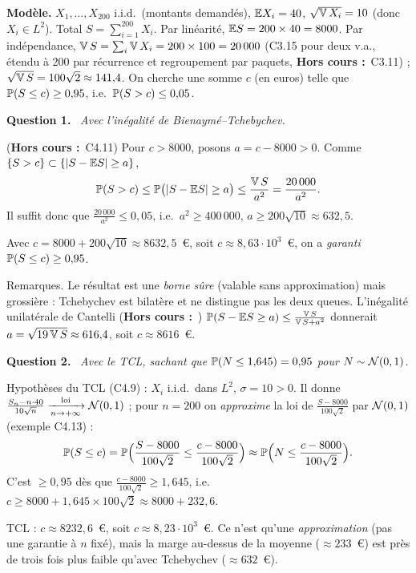 \documentclass[11pt,a4paper]{article}
\newcommand{\question}[1]{\par\medskip\noindent\textbf{Question #1.}~}
\newcommand{\hc}{\textbf{Hors cours :}~}
\begin{document}
\begin{exo}

\textbf{Modèle.} $X_1,\dots,X_{200}$ i.i.d.\ (montants demandés), $\mathbb{E} X_i=40$, $\sqrt{\operatorname{\mathbb{V}} X_i}=10$ (donc $X_i\in L^2$). Total
$S=\sum_{i=1}^{200}X_i$. Par linéarité, $\mathbb{E} S=200\times40=8000$. Par indépendance, $\operatorname{\mathbb{V}} S=\sum_i\operatorname{\mathbb{V}} X_i=200\times100=20\,000$
(C3.15 pour deux v.a., étendu à 200 par récurrence et regroupement par paquets, \hc C3.11) ; $\sqrt{\operatorname{\mathbb{V}} S}=100\sqrt2\approx141{,}4$.
On cherche une somme $c$ (en euros) telle que $\mathbb{P}(S\le c)\ge0{,}95$, i.e.\ $\mathbb{P}(S>c)\le0{,}05$.

\question{1} \emph{Avec l'inégalité de Bienaymé--Tchebychev.}

(\hc C4.11) Pour $c>8000$, posons $a=c-8000>0$. Comme $\{S>c\}\subset\{|S-\mathbb{E} S|\ge a\}$,
\[\mathbb{P}(S>c)\le\mathbb{P}\bigl(|S-\mathbb{E} S|\ge a\bigr)\le\frac{\operatorname{\mathbb{V}} S}{a^2}=\frac{20\,000}{a^2}.\]
Il suffit donc que $\frac{20\,000}{a^2}\le0{,}05$, i.e.\ $a^2\ge400\,000$, $a\ge200\sqrt{10}\approx632{,}5$.
\begin{resultat}
Avec $c=8000+200\sqrt{10}\approx8632{,}5$~€, soit $c\approx8{,}63\cdot10^3$~€, on a \emph{garanti} $\mathbb{P}(S\le c)\ge0{,}95$.
\end{resultat}
Remarques. Le résultat est une \emph{borne sûre} (valable sans approximation) mais grossière : Tchebychev est bilatère et ne
distingue pas les deux queues. L'inégalité unilatérale de Cantelli (\hc) $\mathbb{P}(S-\mathbb{E} S\ge a)\le\frac{\operatorname{\mathbb{V}} S}{\operatorname{\mathbb{V}} S+a^2}$
donnerait $a=\sqrt{19\operatorname{\mathbb{V}} S}\approx616{,}4$, soit $c\approx8616$~€.

\question{2} \emph{Avec le TCL, sachant que $\mathbb{P}(N\le1{,}645)=0{,}95$ pour $N\sim\mathcal{N}(0,1)$.}

Hypothèses du TCL (C4.9) : $X_i$ i.i.d.\ dans $L^2$, $\sigma=10>0$. Il donne
$\frac{S_n-n\cdot40}{10\sqrt n}\xrightarrow[n\to+\infty]{\text{loi}}\mathcal{N}(0,1)$ ; pour $n=200$ on \emph{approxime} la loi de $\frac{S-8000}{100\sqrt2}$ par $\mathcal{N}(0,1)$ (exemple C4.13) :
\[\mathbb{P}(S\le c)=\mathbb{P}\Bigl(\frac{S-8000}{100\sqrt2}\le\frac{c-8000}{100\sqrt2}\Bigr)\approx\mathbb{P}\Bigl(N\le\frac{c-8000}{100\sqrt2}\Bigr).\]
C'est $\ge0{,}95$ dès que $\frac{c-8000}{100\sqrt2}\ge1{,}645$, i.e.\ $c\ge8000+1{,}645\times100\sqrt2\approx8000+232{,}6$.
\begin{resultat}
TCL : $c\approx8232{,}6$~€, soit $c\approx8{,}23\cdot10^3$~€. Ce n'est qu'une \emph{approximation} (pas une garantie à $n$ fixé),
mais la marge au-dessus de la moyenne ($\approx233$~€) est près de trois fois plus faible qu'avec Tchebychev ($\approx632$~€).
\end{resultat}
\end{exo}
\end{document}

